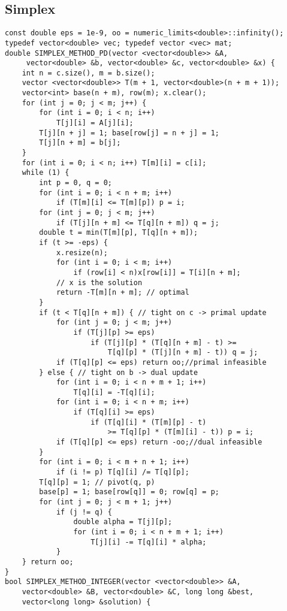 \documentclass[landscape, 8pt, a4paper, oneside]{extarticle}
\begin{document}
\begin{multicols}{3}
\subsection{Simplex}
\begin{verbatim}
const double eps = 1e-9, oo = numeric_limits<double>::infinity();
typedef vector<double> vec; typedef vector <vec> mat;
double SIMPLEX_METHOD_PD(vector <vector<double>> &A,
     vector<double> &b, vector<double> &c, vector<double> &x) {
    int n = c.size(), m = b.size();
    vector <vector<double>> T(m + 1, vector<double>(n + m + 1));
    vector<int> base(n + m), row(m); x.clear();
    for (int j = 0; j < m; j++) {
        for (int i = 0; i < n; i++)
            T[j][i] = A[j][i];
        T[j][n + j] = 1; base[row[j] = n + j] = 1;
        T[j][n + m] = b[j];
    }
    for (int i = 0; i < n; i++) T[m][i] = c[i];
    while (1) {
        int p = 0, q = 0;
        for (int i = 0; i < n + m; i++)
            if (T[m][i] <= T[m][p]) p = i;
        for (int j = 0; j < m; j++)
            if (T[j][n + m] <= T[q][n + m]) q = j;
        double t = min(T[m][p], T[q][n + m]);
        if (t >= -eps) {
            x.resize(n);
            for (int i = 0; i < m; i++)
                if (row[i] < n)x[row[i]] = T[i][n + m];
            // x is the solution
            return -T[m][n + m]; // optimal
        }
        if (t < T[q][n + m]) { // tight on c -> primal update
            for (int j = 0; j < m; j++)
                if (T[j][p] >= eps)
                    if (T[j][p] * (T[q][n + m] - t) >=
                        T[q][p] * (T[j][n + m] - t)) q = j;
            if (T[q][p] <= eps) return oo;//primal infeasible
        } else { // tight on b -> dual update
            for (int i = 0; i < n + m + 1; i++)
                T[q][i] = -T[q][i];
            for (int i = 0; i < n + m; i++)
                if (T[q][i] >= eps)
                    if (T[q][i] * (T[m][p] - t)
                        >= T[q][p] * (T[m][i] - t)) p = i;
            if (T[q][p] <= eps) return -oo;//dual infeasible
        }
        for (int i = 0; i < m + n + 1; i++)
            if (i != p) T[q][i] /= T[q][p];
        T[q][p] = 1; // pivot(q, p)
        base[p] = 1; base[row[q]] = 0; row[q] = p;
        for (int j = 0; j < m + 1; j++)
            if (j != q) {
                double alpha = T[j][p];
                for (int i = 0; i < n + m + 1; i++)
                    T[j][i] -= T[q][i] * alpha;
            }
    } return oo;
}
bool SIMPLEX_METHOD_INTEGER(vector <vector<double>> &A,
    vector<double> &B, vector<double> &C, long long &best,
    vector<long long> &solution) {

\end{verbatim}
\end{multicols}
\end{document}
